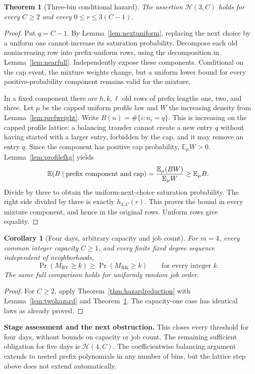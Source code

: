 \documentclass[11pt]{article}
\newtheorem{theorem}{Theorem}
\newtheorem{corollary}{Corollary}
\newcommand{\RV}{\mathrm{RV}}
\newcommand{\RK}{\mathrm{RK}}
\begin{document}
\begin{theorem}[Three-bin conditional hazard]\label{thm:threehazard}
The assertion $\mathcal H(3,C)$ holds for every $C\geq2$ and every
$0\leq r\leq3(C-1)$.
\end{theorem}
\begin{proof}
Put $q=C-1$. By Lemma~\ref{lem:nextuniform}, replacing the next
choice by a uniform one cannot increase its saturation probability.
Decompose each old nonincreasing row into prefix-uniform rows, using
the decomposition in Lemma~\ref{lem:nearfull}. Independently expose
these components. Conditional on the cap event, the mixture weights
change, but a uniform lower bound for every positive-probability
component remains valid for the mixture.

In a fixed component there are $h,k,\ell$ old rows of prefix lengths
one, two, and three. Let $\mu$ be the capped uniform profile law and
$W$ the increasing density from Lemma~\ref{lem:prefweight}.
Write $B(n)=\#\{i:n_i=q\}$. This is increasing on the capped
profile lattice: a balancing transfer cannot create a new entry $q$
without having started with a larger entry, forbidden by the cap,
and it may remove an entry $q$.
Since the component has positive cap probability,
$\mathbb E_\mu W>0$. Lemma~\ref{lem:profilefkg} yields
\[
 \mathbb E(B\mid\hbox{prefix component and cap})
 =\frac{\mathbb E_\mu(BW)}{\mathbb E_\mu W}
 \geq\mathbb E_\mu B.
\]
Divide by three to obtain the uniform-next-choice saturation
probability. The right side divided by three is exactly
$h_{3,C}(r)$. This proves the bound in every mixture component,
and hence in the original rows. Uniform rows give equality.
\end{proof}

\begin{corollary}[Four days, arbitrary capacity and job count]\label{cor:four}
For $m=4$, every common integer capacity $C\geq1$, and every finite
fixed degree sequence independent of neighborhoods,
\[
 \Pr(M_\RV\geq k)\geq\Pr(M_\RK\geq k)
 \qquad\text{for every integer }k.
\]
The same full comparison holds for uniformly random job order.
\end{corollary}
\begin{proof}
For $C\geq2$, apply Theorem~\ref{thm:hazardreduction} with
Lemma~\ref{lem:twohazard} and Theorem~\ref{thm:threehazard}.
The capacity-one case has identical laws as already proved.
\end{proof}

\noindent\textbf{Stage assessment and the next obstruction.}
This closes every threshold for four days, without bounds on capacity
or job count. The remaining sufficient obligation for five days is
$\mathcal H(4,C)$. The coefficientwise balancing argument extends
to nested prefix polynomials in any number of bins, but the lattice
step above does not extend automatically.
\end{document}
